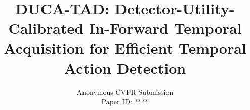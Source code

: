 \documentclass[10pt,twocolumn,letterpaper]{article}
\title{DUCA-TAD: Detector-Utility-Calibrated In-Forward Temporal Acquisition for Efficient Temporal Action Detection}
\author{Anonymous CVPR Submission\\
Paper ID: ****}
\begin{document}
\maketitle









{\small


}

\appendix

\end{document}
